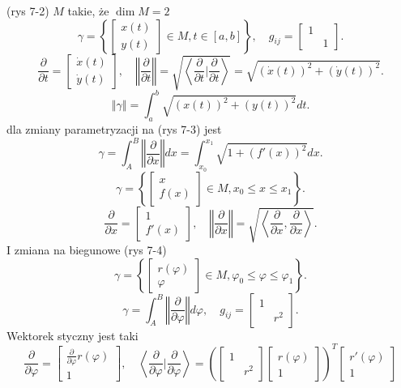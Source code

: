 \documentclass[../main.tex]{subfiles}
\begin{document}
\begin{przyklad}
    (rys 7-2)
$M$ takie, że $\dim M = 2$
 \[
     \gamma = \left\{ \begin{bmatrix} x(t)\\y(t) \end{bmatrix} \in M, t\in[a,b] \right\},\quad g_{ij} = \begin{bmatrix} 1&\\&1 \end{bmatrix}
.\]
\[
    \frac{\partial }{\partial t} = \begin{bmatrix} \dot{x}(t)\\ \dot{y}(t)\end{bmatrix},\quad \left\Vert \frac{\partial }{\partial t}  \right\Vert = \sqrt{\left<\frac{\partial }{\partial t} \Bigg| \frac{\partial }{\partial t}  \right>} = \sqrt{\left( \dot{x}(t) \right) ^2 + \left( \dot{y}(t) \right) ^2}
.\]
\[
    \left\Vert \gamma \right\Vert = \int_a^b \sqrt{\left( x(t) \right) ^2 + \left( y(t) \right) ^2}dt
.\]
dla zmiany parametryzacji na (rys 7-3) jest
\[
    \gamma = \int_A^B \left\Vert \frac{\partial }{\partial x}  \right\Vert dx = \int_{x_0}^{x_1}\sqrt{1 + \left( f'(x) \right) ^2} dx
.\]
\[
    \gamma = \left\{ \begin{bmatrix} x\\ f(x) \end{bmatrix} \in M, x_0 \le x \le x_1 \right\}
.\]
\[
    \frac{\partial }{\partial x} = \begin{bmatrix} 1\\ f'(x) \end{bmatrix},\quad \left\Vert \frac{\partial }{\partial x}  \right\Vert = \sqrt{\left<\frac{\partial }{\partial x} , \frac{\partial }{\partial x}  \right>}
.\]
I zmiana na biegunowe (rys 7-4)
\[
    \gamma = \left\{ \begin{bmatrix} r(\varphi)\\ \varphi \end{bmatrix} \in M, \varphi_0\le\varphi\le\varphi_1 \right\}
.\]
\[
    \gamma = \int_A^B \left\Vert \frac{\partial }{\partial \varphi}  \right\Vert d\varphi,\quad g_{ij} = \begin{bmatrix} 1&\\&r^2 \end{bmatrix}
.\]
Wektorek styczny jest taki
\[
    \frac{\partial }{\partial \varphi}  = \begin{bmatrix} \frac{\partial }{\partial \varphi} r(\varphi)\\ 1 \end{bmatrix},\quad \left<\frac{\partial }{\partial \varphi} | \frac{\partial }{\partial \varphi}  \right> = \left( \begin{bmatrix} 1&\\&r^2 \end{bmatrix} \begin{bmatrix} r(\varphi)\\ 1 \end{bmatrix}  \right) ^T \begin{bmatrix} r'(\varphi) \\ 1 \end{bmatrix}
\]
\end{przyklad}
\end{document}
